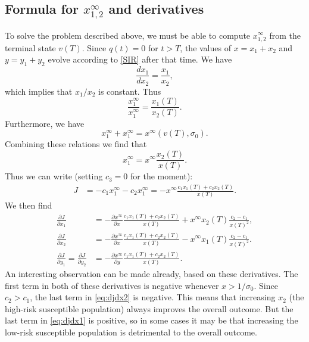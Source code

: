 \documentclass[english,12pt,letter]{article}
\newcommand{\Rnot}{\sigma_0}
\newcommand{\xinf}{x^\infty}
\newcommand{\xoneinf}{x_1^\infty}
\newcommand{\xtwoinf}{x_1^\infty}
\newcommand{\xonetwoinf}{x_{1,2}^\infty}
\begin{document}
\subsection{Formula for $x_{1,2}^\infty$ and derivatives}
To solve the problem described above, we must be able to compute
$\xonetwoinf$ from the terminal state $v(T)$.  Since $q(t)=0$ for $t>T$,
the values of $x=x_1+x_2$ and $y=y_1+y_2$ evolve according to \eqref{SIR}
after that time.  We have
$$
\frac{d x_1}{d x_2} = \frac{x_1}{x_2},
$$
which implies that $x_1/x_2$ is constant.  Thus
$$
\frac{\xoneinf}{\xtwoinf} = \frac{x_1(T)}{x_2(T)}.
$$
Furthermore, we have
$$
\xoneinf + \xtwoinf = \xinf(v(T),\Rnot).
$$
Combining these relations we find that
$$
    \xtwoinf = \xinf \frac{x_2(T)}{x(T)}.
$$
Thus we can write (setting $c_3=0$ for the moment):
\begin{align}
    J & = -c_1 \xoneinf - c_2 \xtwoinf = - \xinf \frac{c_1 x_1(T) + c_2 x_2(T)}{x(T)}.
\end{align}
We then find
\begin{align}
    \frac{\partial J}{\partial x_1} & = - \frac{\partial \xinf}{\partial x}\frac{c_1 x_1(T) + c_2 x_2(T)}{x(T)} 
            + \xinf x_2(T) \frac{c_2-c_1}{x(T)^2}, \label{eq:djdx1} \\
    \frac{\partial J}{\partial x_2} & = - \frac{\partial \xinf}{\partial x}\frac{c_1 x_1(T) + c_2 x_2(T)}{x(T)} 
            - \xinf x_1(T) \frac{c_2-c_1}{x(T)^2}. \label{eq:djdx2} \\
    \frac{\partial J}{\partial y_1} = \frac{\partial J}{\partial y_2} & = - \frac{\partial \xinf}{\partial y}\frac{c_1 x_1(T) + c_2 x_2(T)}{x(T)}.
\end{align}
An interesting observation can be made already, based on these derivatives.
The first term in both of these derivatives is negative whenever $x>1/\Rnot$.
Since $c_2>c_1$, the last term in \eqref{eq:djdx2} is negative.  This means that
increasing $x_2$ (the high-risk susceptible population) always improves the overall outcome.
But the last term in \eqref{eq:djdx1} is positive, so in some cases it may be that
increasing the low-risk susceptible population is detrimental to the overall outcome.
\end{document}
